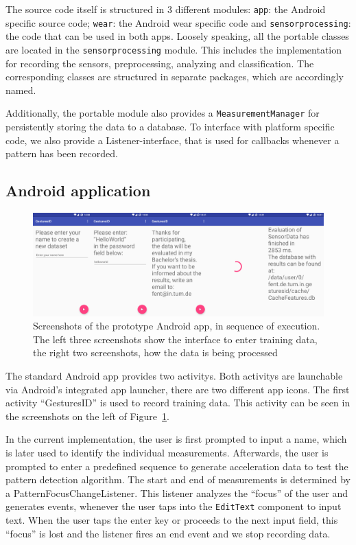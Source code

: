 The source code itself is structured in 3 different modules: \lstinline$app$: the Android specific source code; \lstinline$wear$: the Android wear specific code and \lstinline$sensorprocessing$: the code that can be used in both apps. Loosely speaking, all the portable classes are located in the \lstinline$sensorprocessing$ module. This includes the implementation for recording the sensors, preprocessing, analyzing and classification. The corresponding classes are structured in separate \glspl{package}, which are accordingly named.

Additionally, the portable module also provides a \lstinline$MeasurementManager$ for persistently storing the data to a database. To interface with platform specific code, we also provide a Listener-interface, that is used for callbacks whenever a pattern has been recorded.

\subsection{Android application}
\begin{figure}
    \centering
    \includegraphics[width=\textwidth]{figures/MeasurementPhone.png}
    \caption{Screenshots of the prototype Android \gls{app}, in sequence of execution. The left three screenshots show the interface to enter training data, the right two screenshots, how the data is being processed}
    \label{fig:phonescreenshot}
\end{figure}

The standard Android \gls{app} provides two \glspl{activity}. Both \glspl{activity} are launchable via Android's integrated \gls{app} launcher, \ie there are two different \gls{app} icons. The first \gls{activity} ``GesturesID'' is used to record training data. This activity can be seen in the screenshots on the left of Figure~\ref{fig:phonescreenshot}.

In the current implementation, the user is first prompted to input a name, which is later used to identify the individual measurements. Afterwards, the user is prompted to enter a predefined sequence  to generate acceleration data to test the pattern detection algorithm. The start and end of measurements is determined by a {\ttfamily Pattern\-Focus\-Change\-Listener}. This listener analyzes the ``focus'' of the user and generates events, whenever the user taps into the \lstinline$EditText$ component to input text. When the user taps the enter key or proceeds to the next input field, this ``focus'' is lost and the listener fires an end event and we stop recording data.

